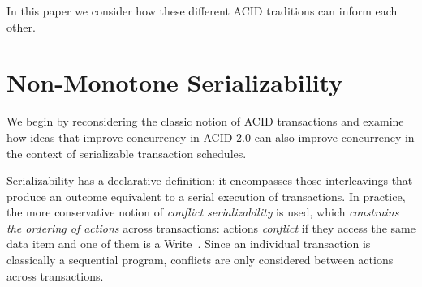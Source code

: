 \documentclass{sig-alternate}
\newcommand{\jmh}[1]{{\textcolor{red}{#1 -- jmh}}}
\newcommand{\paa}[1]{{\textcolor{blue}{[[#1 -- paa]]}}}
\begin{document}
In this paper we consider how these different ACID traditions can inform each
other.

\begin{comment}
At the risk of over-simplifying, ACID transactions are often thought of
as an \emph{inter-transaction} approach, realized by \emph{enforcing an order}
that satisfies serializability.  ACID 2.0 can be thought of as an
\emph{intra-transaction} approach that \emph{tolerates disorder} when
non-deterministic orders result in deterministic outcomes.  This is not a
precise characterization as we discuss below, but it is useful for framing
discussion.  \paa{I am not sure I get/buy the inter vs. intra dichotomy.  it
  seems to me that the transactional abstraction lets you write ordered programs
  and gives a guarantee of an *extension* of that order in a "correct" global
  schedule, whereas calm asks for unordered programs and in return gives correct
  executions.  *both* allow the programmer to not explicitly reason about
  inter-xact interleavings.} \jmh{Are you equating CALM with pure monotonicity?
  Because Bloom, with non-monotonicity, does not help reasoning transactionally.
  As I discuss below, pure monotonicity is trivially serializable, but that
  doesn't really help think about most transactions.}
\end{comment}

\section{Non-Monotone Serializability}
We begin by reconsidering the classic notion of ACID transactions and examine
how ideas that improve concurrency in ACID 2.0 can also improve concurrency in
the context of serializable transaction schedules.

Serializability has a declarative definition: it encompasses those interleavings
that produce an outcome equivalent to a serial execution of transactions.  In
practice, the more conservative notion of \emph{conflict serializability} is
used, which \emph{constrains the ordering of actions} across transactions:
actions \emph{conflict} if they access the same data item and one of them is a
Write~\cite{Eswaran1976}.  Since an individual transaction is classically a
sequential program, conflicts are only considered between actions across
transactions.
\end{document}
